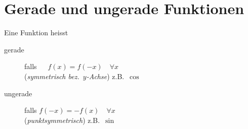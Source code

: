 \section{Gerade und ungerade Funktionen} %
	\begin{definition}
		Eine Funktion heisst
		\begin{description}
			\item[\phantom{un}gerade] falls $\phantom{-}f(x) = f(-x) \quad \forall x$ \\[.5ex] (\emph{symmetrisch bez.~$y$-Achse}) z.B.~$\cos$
			\item[ungerade] falls $f(-x) = -f(x) \quad \forall x$ \\[.5ex]
			(\emph{punktsymmetrisch}) z.B.~$\sin$
		\end{description}
	\end{definition}
	
